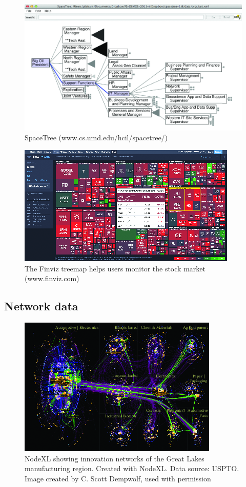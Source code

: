 \documentclass[]{krantz}
\begin{document}
\begin{figure}

{\centering \includegraphics[width=0.7\linewidth]{ChapterViz/figures/fig9-8} 

}

\caption{SpaceTree (www.cs.umd.edu/hcil/spacetree/)}\label{fig:fig9-8}
\end{figure}

\begin{figure}

{\centering \includegraphics[width=0.7\linewidth]{ChapterViz/figures/fig9-9} 

}

\caption{The Finviz treemap helps users monitor the stock market (www.finviz.com)}\label{fig:fig9-9}
\end{figure}

\subsection{Network data}\label{sec:viz-2.6}

\begin{figure}

{\centering \includegraphics[width=0.7\linewidth]{ChapterViz/figures/fig9-10} 

}

\caption{NodeXL showing innovation networks of the Great Lakes manufacturing region. Created with NodeXL. Data source: USPTO. Image created by C. Scott Dempwolf, used with permission}\label{fig:fig9-10}
\end{figure}
\end{document}
